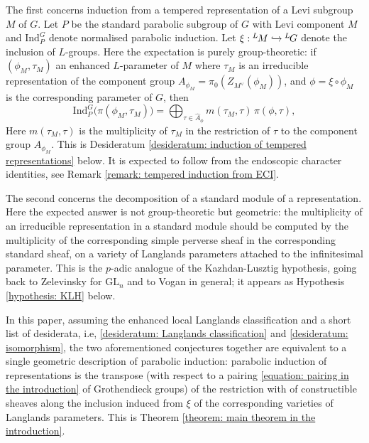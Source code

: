 \documentclass[11pt,letterpaper]{amsart}
\newcommand{\GL}{\mathrm{GL}}
\newcommand{\dualgroup}[1]{{#1}^\vee}
\newcommand{\irrepdual}[1]{\widehat{#1}}
\newcommand{\Lgroup}[1]{{\hskip-2 pt \,^L\hskip-1pt{#1}}}
\newcommand{\Ind}{\mathrm{Ind}}
\renewcommand{\1}{\mathbbm{1}}
\numberwithin{equation}{section}
\begin{document}
The first concerns induction from a tempered representation of a Levi subgroup $M$ of $G$. Let $P$ be the standard parabolic subgroup of $G$ with Levi component $M$ and $\Ind_P^G$ denote normalised parabolic induction. Let $\xi: \Lgroup{M} \xhookrightarrow{}\Lgroup{G}$ denote the inclusion of $L$-groups. Here the expectation is purely group-theoretic: if $(\phi_M, \tau_M)$ an enhanced $L$-parameter of $M$ where $\tau_M$ is an irreducible representation of the component group $A_{\phi_M}=\pi_0(Z_{\dualgroup{M}}(\phi_M))$, and $\phi=\xi\circ\phi_M$ is the corresponding parameter of $G$, then
\[{\Ind_P^G\big(\pi(\phi_M,\tau_M)\big)=\bigoplus_{\tau\in \irrepdual{A}_\phi} m(\tau_M,\tau)\,\pi(\phi,\tau),}\]
{Here $m(\tau_M,\tau)$ is the multiplicity of $\tau_M$ in the restriction of $\tau$ to the component group $A_{\phi_M}$. This is Desideratum \ref{desideratum: induction of tempered representations} below. It is expected to follow from the endoscopic character identities, see Remark \ref{remark: tempered induction from ECI}.}

The second concerns the decomposition of a standard module of a representation. Here the expected answer is not group-theoretic but geometric: the multiplicity of an irreducible representation in a standard module should be computed by the multiplicity of the corresponding simple perverse sheaf in the corresponding standard sheaf, on a variety of Langlands parameters attached to the infinitesimal parameter. This is the $p$-adic analogue of the Kazhdan-Lusztig hypothesis, going back to Zelevinsky for $\GL_n$ and to Vogan \cite{Vog93} in general; it appears as Hypothesis \ref{hypothesis: KLH} below.

{In this paper, assuming the enhanced local Langlands classification and a short list of desiderata, i.e, \ref{desideratum: Langlands classification} and \ref{desideratum: isomorphism}, the two aforementioned conjectures together are equivalent to a single geometric description of parabolic induction: parabolic induction of representations is the transpose (with respect to a pairing \eqref{equation: pairing in the introduction} of Grothendieck groups) of the restriction with of constructible sheaves along the inclusion induced from $\xi$ of the corresponding varieties of Langlands parameters. This is Theorem \ref{theorem: main theorem in the introduction}. 
}
\end{document}
